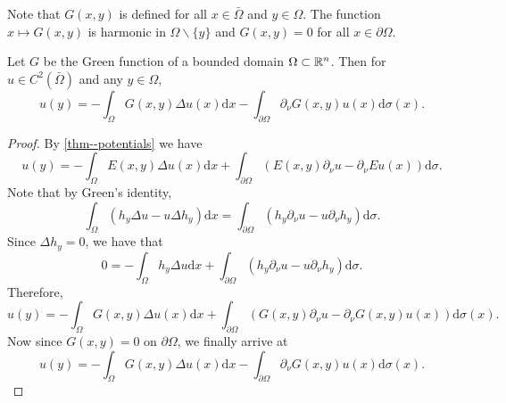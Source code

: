 \documentclass[11pt]{article}
\begin{document}
				Note that $G(x,y)$ is defined for all $x\in\bar{\Omega}$ and $y\in\Omega$. The function $x\mapsto G(x,y)$ is harmonic in $\Omega\backslash\{y\}$ and $G(x,y)=0$ for all $x\in\partial\Omega$.

				\begin{cor}
					Let $G$ be the Green function of a bounded domain $\Omega\subset\mathbb{R}^n$. Then for $u\in C^2(\bar{\Omega})$ and any $y\in\Omega$,
					\begin{equation*}
						u(y)=-\int_\Omega G(x,y)\Delta u(x)\mathrm{d}x-\int_{\partial\Omega}\partial_\nu G(x,y)u(x)\mathrm{d}\sigma(x).
					\end{equation*}
				\end{cor}
				\begin{proof}
					By \autoref{thm--potentials} we have
					\begin{equation*}
						u(y)=-\int_\Omega E(x,y)\Delta u(x)\mathrm{d}x+\int_{\partial\Omega}\left(E(x,y)\partial_\nu u-\partial_\nu E u(x)\right)\mathrm{d}\sigma.
					\end{equation*}
					Note that by Green's identity,
					\begin{equation*}
						\int_\Omega\left(h_y\Delta u-u\Delta h_y\right)\mathrm{d}x=\int_{\partial\Omega}\left(h_y\partial_\nu u-u\partial_\nu h_y\right)\mathrm{d}\sigma.
					\end{equation*}
					Since $\Delta h_y=0$, we have that
					\begin{equation*}
						0=-\int_{\Omega}h_y\Delta u \mathrm{d}x+\int_{\partial\Omega}\left(h_y\partial_\nu u-u\partial_\nu h_y\right)\mathrm{d}\sigma.
					\end{equation*}
					Therefore,
					\begin{equation*}
						u(y)=-\int_\Omega G(x,y)\Delta u(x)\mathrm{d}x+\int_{\partial\Omega}\left(G(x,y)\partial_\nu u-\partial_\nu G(x,y) u(x)\right)\mathrm{d}\sigma(x).
					\end{equation*}
					Now since $G(x,y)=0$ on $\partial\Omega$, we finally arrive at
					\begin{equation*}
						u(y)=-\int_\Omega G(x,y)\Delta u(x)\mathrm{d}x-\int_{\partial\Omega}\partial_\nu G(x,y)u(x)\mathrm{d}\sigma(x).
					\end{equation*}
				\end{proof}
\end{document}
